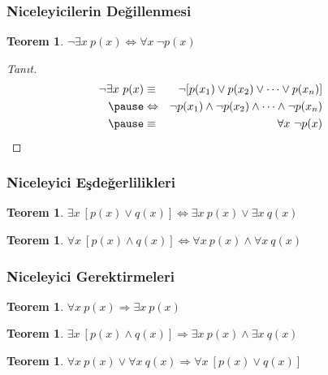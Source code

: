 \documentclass[dvipsnames]{beamer}
\theoremstyle{definition}
\theoremstyle{example}
\theoremstyle{plain}
\newtheorem{teorem}[theorem]{Teorem}
\begin{document}
\begin{frame}
  \frametitle{Niceleyicilerin Değillenmesi}

  \begin{teorem}
    $\neg \exists x~p(x) \Leftrightarrow \forall x~\neg p(x)$
  \end{teorem}

  \pause
  \begin{proof}[Tanıt]
    \begin{eqnarray*}
      \neg \exists x~p(x) & \equiv          & \neg [p(x_1) \vee p(x_2) \vee \cdots
                                              \vee p(x_n)]\\\pause
                          & \Leftrightarrow & \neg p(x_1) \wedge \neg p(x_2) \wedge \cdots
                                              \wedge \neg p(x_n)\\\pause
                          & \equiv          & \forall x~\neg p(x)
    \end{eqnarray*}
  \end{proof}
\end{frame}

\begin{frame}
  \frametitle{Niceleyici Eşdeğerlilikleri}

  \begin{teorem}
    $\exists x~[p(x) \vee q(x)]
      \Leftrightarrow \exists x~p(x) \vee \exists x~q(x)$
  \end{teorem}

  \pause
  \begin{teorem}
    $\forall x~[p(x) \wedge q(x)]
      \Leftrightarrow \forall x~p(x) \wedge \forall x~q(x)$
  \end{teorem}
\end{frame}

\begin{frame}
  \frametitle{Niceleyici Gerektirmeleri}

  \begin{teorem}
    $\forall x~p(x) \Rightarrow \exists x~p(x)$
  \end{teorem}

  \pause
  \begin{teorem}
    $\exists x~[p(x) \wedge q(x)]
      \Rightarrow \exists x~p(x) \wedge \exists x~q(x)$
  \end{teorem}

  \pause
  \begin{teorem}
    $\forall x~p(x) \vee \forall x~q(x)
      \Rightarrow \forall x~[p(x) \vee q(x)]$
  \end{teorem}
\end{frame}
\end{document}
